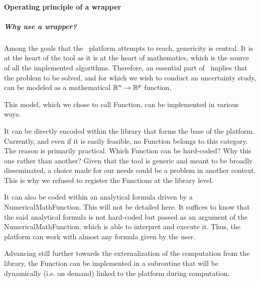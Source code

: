 
\paragraph{Operating principle of a wrapper}

\subparagraph{Why use a wrapper?}

Among the goals that the \OT\ platform attempts to reach, genericity is central. It is at the heart of the tool as it is at the heart of mathematics, which is the source of all the implemented algorithms. Therefore, an essential part of \OT\ implies that the problem to be solved, and for which we wish to conduct an uncertainty study, can be modeled as a mathematical ${\mathbb R}^{n} \to {\mathbb R}^{p}$ function.

This model, which we chose to call Function, can be implemented in various ways.

It can be directly encoded within the library that forms the base of the platform. Currently, and even if it is easily feasible, no Function belongs to this category. The reason is primarily practical. Which Function can be hard-coded? Why this one rather than another? Given that the tool is generic and meant to be broadly disseminated, a choice made for our needs could be a problem in another context. This is why we refused to register the Functions at the library level.

It can also be coded within an analytical formula driven by a NumericalMathFunction. This will not be detailed here. It suffices to know that the said analytical formula is not hard-coded but passed as an argument of the NumericalMathFunction, which is able to interpret and execute it. Thus, the platform can work with almost any formula given by the user.

Advancing still further towards the externalization of the computation from the library, the Function can be implemented in a subroutine that will be dynamically (i.e. on demand) linked to the platform during computation.

